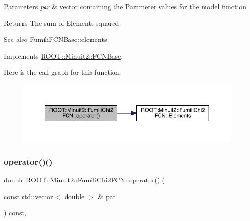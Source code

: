 \begin{DoxyParams}{Parameters}
{\em par} & vector containing the Parameter values for the model function\\
\hline
\end{DoxyParams}
\begin{DoxyReturn}{Returns}
The sum of Elements squared
\end{DoxyReturn}
\begin{DoxySeeAlso}{See also}
Fumili\+F\+C\+N\+Base\+::elements 
\end{DoxySeeAlso}


Implements \mbox{\hyperlink{classROOT_1_1Minuit2_1_1FCNBase_ae4a86bd94d0d0f5ca6fc8f8ab2bb43cd}{R\+O\+O\+T\+::\+Minuit2\+::\+F\+C\+N\+Base}}.

Here is the call graph for this function\+:
\nopagebreak
\begin{figure}[H]
\begin{center}
\leavevmode
\includegraphics[width=350pt]{d3/df0/classROOT_1_1Minuit2_1_1FumiliChi2FCN_ae7b2c2080162c0b946cf54090b712716_cgraph}
\end{center}
\end{figure}
\mbox{\label{classROOT_1_1Minuit2_1_1FumiliChi2FCN_ae7b2c2080162c0b946cf54090b712716}} 
\subsubsection{\texorpdfstring{operator()()}{operator()()}\hspace{0.1cm}{\footnotesize\ttfamily [2/3]}}
{\footnotesize\ttfamily double R\+O\+O\+T\+::\+Minuit2\+::\+Fumili\+Chi2\+F\+C\+N\+::operator() (\begin{DoxyParamCaption}\item[{const std\+::vector$<$ double $>$ \&}]{par }\end{DoxyParamCaption}) const\hspace{0.3cm}{\ttfamily [inline]}, {\ttfamily [virtual]}}

